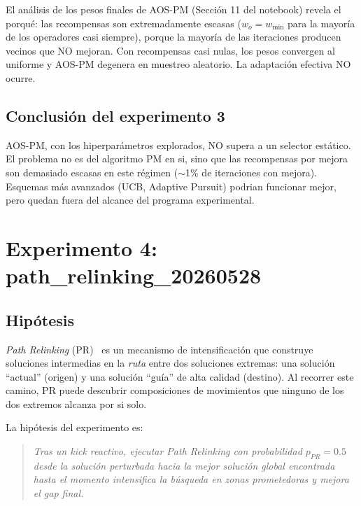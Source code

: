 \documentclass[11pt,a4paper]{article}
\theoremstyle{definition}
\theoremstyle{remark}
\begin{document}
El análisis de los pesos finales de AOS-PM (Sección 11 del notebook)
revela el porqué: las recompensas son extremadamente escasas
($w_o = w_{\min}$ para la mayoría de los operadores casi siempre),
porque la mayoría de las iteraciones producen vecinos que NO mejoran.
Con recompensas casi nulas, los pesos convergen al uniforme y AOS-PM
degenera en muestreo aleatorio. La adaptación efectiva NO ocurre.

\subsection{Conclusión del experimento 3}

AOS-PM, con los hiperparámetros explorados, NO supera a un selector
estático. El problema no es del algoritmo PM en si, sino que las
recompensas por mejora son demasiado escasas en este régimen ($\sim$1\%
de iteraciones con mejora). Esquemas más avanzados (UCB, Adaptive
Pursuit) podrian funcionar mejor, pero quedan fuera del alcance del
programa experimental.

\section{Experimento 4: path\_relinking\_20260528}
\label{sec:exp-pr}

\subsection{Hipótesis}

\emph{Path Relinking} (PR)~\cite{glover2000} es un mecanismo de intensificación que
construye soluciones intermedias en la \emph{ruta} entre dos
soluciones extremas: una solución ``actual'' (origen) y una solución
``guía'' de alta calidad (destino). Al recorrer este camino, PR puede
descubrir composiciones de movimientos que ninguno de los dos extremos
alcanza por si solo.

La hipótesis del experimento es:

\begin{quote}
\textit{Tras un kick reactivo, ejecutar Path Relinking con probabilidad
$p_{PR} = 0.5$ desde la solución perturbada hacia la mejor solución
global encontrada hasta el momento intensifica la búsqueda en zonas
prometedoras y mejora el gap final.}
\end{quote}
\end{document}
